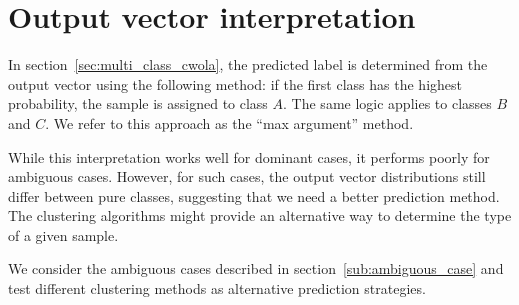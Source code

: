 \documentclass[12pt]{article}
\begin{document}
\section{Output vector interpretation}%
\label{sec:output_vector_interpretation}
    In section~\ref{sec:multi_class_cwola}, the predicted label is determined from the output vector using the following method: if the first class has the highest probability, the sample is assigned to class $A$. The same logic applies to classes $B$ and $C$. We refer to this approach as the ``max argument'' method. 

    While this interpretation works well for dominant cases, it performs poorly for ambiguous cases. However, for such cases, the output vector distributions still differ between pure classes, suggesting that we need a better prediction method. The clustering algorithms might provide an alternative way to determine the type of a given sample.

    We consider the ambiguous cases described in section~\ref{sub:ambiguous_case} and test different clustering methods as alternative prediction strategies.
\end{document}
